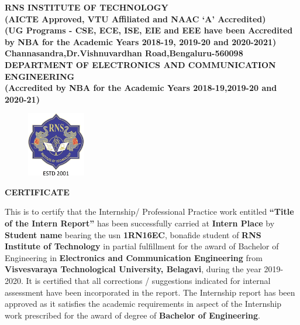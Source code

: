 %
\setlength{\toptafiddle}{1in}
\setlength{\bottafiddle}{1in}
\vspace*{-0.65in}
\enlargethispage{\bottafiddle}
\thispagestyle{empty}


\begin{center}
\small\textbf{{\color{blue}	RNS INSTITUTE OF TECHNOLOGY\\
(AICTE Approved, VTU Affiliated and NAAC `A' Accredited)\\
(UG Programs - CSE, ECE, ISE, EIE and EEE have been Accredited by NBA for the Academic Years 2018-19, 2019-20 and 2020-2021)\\
Channasandra,Dr.Vishnuvardhan Road,Bengaluru-560098}\\
\vspace{0.3cm}
DEPARTMENT OF ELECTRONICS AND COMMUNICATION ENGINEERING\\
(Accredited by NBA for the Academic Years 2018-19,2019-20 and 2020-21)
}
\end{center}

\begin{center}
\begin{figure}[h]
\centering
\includegraphics[height=2.8cm]{images/rns1.jpg}
\end{figure}
\Large{\textbf{CERTIFICATE}}
\end{center}

This is to certify that the Internship/ Professional Practice work entitled \textbf{``Title of the Intern Report''} has been successfully carried at \textbf{Intern Place} by \textbf{Student name} bearing the usn \textbf{1RN16EC}, bonafide student of \textbf{\color{blue}RNS Institute of Technology} in partial fulfillment for the award of Bachelor of Engineering in \textbf{\color{blue}Electronics and Communication Engineering} from \textbf{\color{blue}Visvesvaraya Technological University, Belagavi}, during the year 2019-2020. It is certified that all corrections / suggestions indicated for internal assessment have been incorporated in the report. The Internship report has been approved as it satisfies the academic requirements in aspect of the Internship work prescribed for the award of degree of \textbf{\color{blue}Bachelor of Engineering}.

